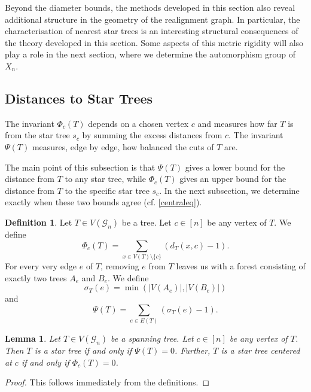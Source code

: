 \documentclass[reqno,dvipsnames]{amsart}
\theoremstyle{plain}
\newtheorem{lemma}[theorem]{Lemma}
\numberwithin{equation}{section}
\theoremstyle{definition}
\newtheorem{definition}[theorem]{Definition}
\begin{document}
Beyond the diameter bounds, the methods developed in this section also reveal additional structure in the geometry of the realignment graph. In particular, the characterisation of nearest star trees is an interesting structural consequences of the theory developed in this section. Some aspects of this metric rigidity will also play a role in the next section, where we determine the automorphism group of $X_n$.

\subsection{Distances to Star Trees}

The invariant $\Phi_c(T)$ depends on a chosen vertex $c$ and measures how far $T$ is from the star tree $s_c$ by summing the excess distances from $c$. The invariant $\Psi(T)$ measures, edge by edge, how balanced the cuts of $T$ are. 

The main point of this subsection is that $\Psi(T)$ gives a lower bound for the distance from $T$ to any star tree, while $\Phi_c(T)$ gives an upper bound for the distance from $T$ to the specific star tree $s_c$. In the next subsection, we determine exactly when these two bounds agree (cf. \autoref{centraleq}).

\begin{definition}
	Let $T\in V(\mathcal{G}_n)$ be a tree. Let $c\in [n]$ be any vertex of $T$. We define
	\[
	\Phi_c(T) = \sum_{x\in V(T)\setminus \{c\}} (d_{T}(x,c)-1).
	\]
	For every very edge $e$ of $T$, removing $e$ from $T$ leaves us with a forest consisting of exactly two trees $A_e$ and $B_e$. We define 
	\[\sigma_T(e) = \min(|V(A_e)|,|V(B_e)|)
	\]
	and 
	\[
	\Psi(T) = \sum_{e\in E(T)}(\sigma_T(e)-1).
	\]
\end{definition}

\begin{lemma}
	Let $T\in V(\mathcal{G}_n)$ be a spanning tree. Let $c\in [n]$ be any vertex of $T$. Then $T$ is a star tree if and only if $\Psi(T) = 0$. Further, $T$ is a star tree centered at $c$ if and only if $\Phi_c(T) = 0$.
\end{lemma}

\begin{proof}
	This follows immediately from the definitions.
\end{proof}
\end{document}
